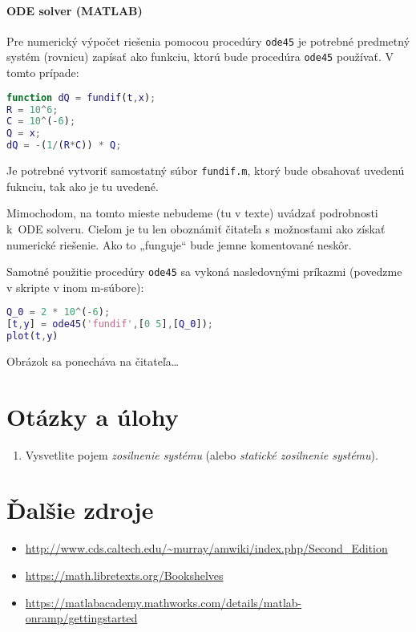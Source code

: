 \documentclass[a4paper, 10pt, ]{article}
\begin{document}
\paragraph{ODE solver (MATLAB)}

Pre numerický výpočet riešenia pomocou procedúry \verb|ode45| je potrebné predmetný systém (rovnicu) zapísať ako funkciu, ktorú bude procedúra \verb|ode45| používať. V tomto prípade:
\begin{lstlisting}[language=Matlab,]
function dQ = fundif(t,x);
R = 10^6;
C = 10^(-6);
Q = x;
dQ = -(1/(R*C)) * Q;
\end{lstlisting}
Je potrebné vytvoriť samostatný súbor \verb|fundif.m|, ktorý bude obsahovať uvedenú fuknciu, tak ako je tu uvedené.

Mimochodom, na tomto mieste nebudeme (tu v texte) uvádzať podrobnosti k~ODE solveru. Cieľom je tu len oboznámiť čitateľa s možnosťami ako získať numerické riešenie. Ako to „funguje“ bude jemne komentované neskôr.

Samotné použitie procedúry \verb|ode45| sa vykoná nasledovnými príkazmi (povedzme v skripte v inom m-súbore):
\begin{lstlisting}[language=Matlab,]
Q_0 = 2 * 10^(-6);
[t,y] = ode45('fundif',[0 5],[Q_0]);
plot(t,y)
\end{lstlisting}
Obrázok sa ponecháva na čitateľa\ldots









\section{Otázky a úlohy}

\begin{enumerate}[leftmargin=0pt, labelsep=3mm, itemsep=0pt]
	\item Vysvetlite pojem \emph{zosilnenie systému} (alebo \emph{statické zosilnenie systému}).
\end{enumerate}



\renewcommand{\refname}{Odporúčaná literatúra}

\nocite{*}
{}






\section*{Ďalšie zdroje}

\begin{itemize}[leftmargin=0pt, labelsep=3mm, itemsep=0pt]
    \item \url{http://www.cds.caltech.edu/~murray/amwiki/index.php/Second_Edition}
	\item \url{https://math.libretexts.org/Bookshelves}
	\item \url{https://matlabacademy.mathworks.com/details/matlab-onramp/gettingstarted}
\end{itemize}
\end{document}
